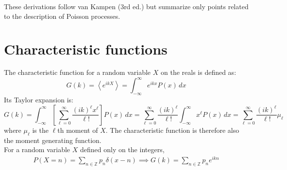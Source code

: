 \documentclass{article}
\begin{document}
\large

These derivations follow van Kampen (3rd ed.) but summarize only points related to the description of Poisson processes.

\section*{Characteristic functions}
The characteristic function for a random variable $X$ on the reals is defined as:
\[ G(k) =\left< e^{ikX} \right> = \int_{-\infty}^{\infty} e^{ikx} P(x)\, dx \]
Its Taylor expansion is:
\[ G(k) =  \int_{-\infty}^{\infty} \left[ \sum_{\ell=0}^{\infty} \frac{\left(ik \right)^{\ell}x^{\ell}}{\ell!} \right] P(x)\, dx = \sum_{\ell=0}^{\infty} \frac{\left(ik \right)^{\ell}}{\ell!}  \int_{-\infty}^{\infty} x^{\ell} P(x)\, dx =  \sum_{\ell=0}^{\infty} \frac{\left(ik \right)^{\ell}}{\ell!} \mu_{\ell}\]
where $\mu_{\ell}$ is the $\ell$th moment of $X$. The characteristic function is therefore also the moment generating function.\\

For a random variable $X$ defined only on the integers,
\begin{eqnarray*}
 P(X=n) = \sum_{n \in \mathbb{Z}} p_n \delta(x-n) \implies G(k) = \sum_{n \in \mathbb{Z}} p_n e^{ikn} \label{eqn:discretechar}
 \end{eqnarray*}
\end{document}
